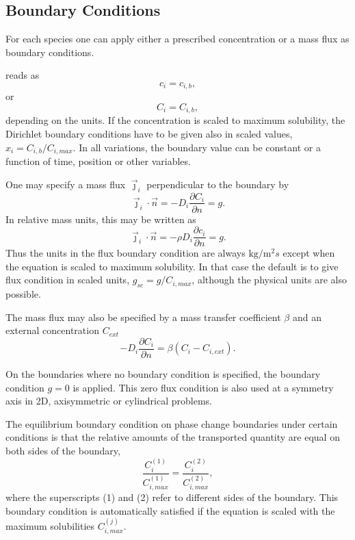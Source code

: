 \subsection{Boundary Conditions}

For each species one can apply either a prescribed concentration or a mass
flux as boundary conditions.

 reads as
\begin{equation}
c_i=c_{i,b},
\end{equation}
or
\begin{equation}
C_i=C_{i,b},
\end{equation}
depending on the units. If the concentration is scaled to maximum
solubility, the Dirichlet boundary conditions have to be given also in
scaled values, $x_i = C_{i,b}/C_{i,max}$. In all variations, the
boundary value can be constant or a function of time, position or
other variables.

One may specify a mass flux $\vec{\jmath}_i$ perpendicular to the boundary by
\begin{equation}
\vec{\jmath}_i\cdot\vec{n} = -D_i\frac{\partial C_i}{\partial n} = g.
\end{equation}
In relative mass units, this may be written as
\begin{equation}
\vec{\jmath}_i\cdot\vec{n} = -\rho D_i\frac{\partial c_i}{\partial n} = g.
\end{equation}
Thus the units in the flux boundary condition are always
$\mathrm{kg}/\mathrm{m}^2s$ except when the equation is scaled to
maximum solubility. In that case the default is to give flux condition
in scaled units, $g_{sc} = g/C_{i,max}$, although the physical
units are also possible.

The mass flux may also be specified by a mass transfer coefficient
$\beta$ and an external concentration $C_{ext}$
\begin{equation}
-D_i\frac{\partial C_i}{\partial n} = \beta(C_i-C_{i,ext}).
\end{equation}

On the boundaries where no boundary condition is specified, the
boundary condition $g=0$ is applied. This zero flux
condition is also used at a symmetry axis in 2D, axisymmetric or
cylindrical problems.

The equilibrium boundary condition on phase change boundaries under
certain conditions is that the relative amounts of the transported
quantity are equal on both sides of the boundary, 
\begin{equation}
\frac{C_i^{(1)}}{C^{(1)}_{i,max}} = \frac{C_i^{(2)}}{C^{(2)}_{i,max}},
\end{equation}
where the superscripts (1) and (2) refer to different sides of the
boundary. This boundary condition is automatically satisfied if the
equation is scaled with the maximum solubilities $C^{(j)}_{i,max}$.

